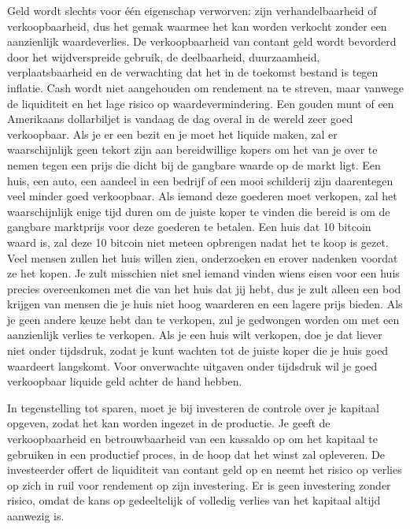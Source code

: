 Geld wordt slechts voor één eigenschap verworven: zijn verhandelbaarheid of verkoopbaarheid, dus het gemak waarmee het kan worden verkocht zonder een aanzienlijk waardeverlies. De verkoopbaarheid van contant geld wordt bevorderd door het wijdverspreide gebruik, de deelbaarheid, duurzaamheid, verplaatsbaarheid en de verwachting dat het in de toekomst bestand is tegen inflatie. Cash wordt niet aangehouden om rendement na te streven, maar vanwege de liquiditeit en het lage risico op waardevermindering. Een gouden munt of een Amerikaans dollarbiljet is vandaag de dag overal in de wereld zeer goed verkoopbaar. Als je er een bezit en je moet het liquide maken, zal er waarschijnlijk geen tekort zijn aan bereidwillige kopers om het van je over te nemen tegen een prijs die dicht bij de gangbare waarde op de markt ligt. Een huis, een auto, een aandeel in een bedrijf of een mooi schilderij zijn daarentegen veel minder goed verkoopbaar. Als iemand deze goederen moet verkopen, zal het waarschijnlijk enige tijd duren om de juiste koper te vinden die bereid is om de gangbare marktprijs voor deze goederen te betalen. Een huis dat 10 bitcoin waard is, zal deze 10 bitcoin niet meteen opbrengen nadat het te koop is gezet. Veel mensen zullen het huis willen zien, onderzoeken en erover nadenken voordat ze het kopen. Je zult misschien niet snel iemand vinden wiens eisen voor een huis precies overeenkomen met die van het huis dat jij hebt, dus je zult alleen een bod krijgen van mensen die je huis niet hoog waarderen en een lagere prijs bieden. Als je geen andere keuze hebt dan te verkopen, zul je gedwongen worden om met een aanzienlijk verlies te verkopen. Als je een huis wilt verkopen, doe je dat liever niet onder tijdsdruk, zodat je kunt wachten tot de juiste koper die je huis goed waardeert langskomt. Voor onverwachte uitgaven onder tijdsdruk wil je goed verkoopbaar liquide geld achter de hand hebben.

In tegenstelling tot sparen, moet je bij investeren de controle over je kapitaal opgeven, zodat het kan worden ingezet in de productie. Je geeft de verkoopbaarheid en betrouwbaarheid van een kassaldo op om het kapitaal te gebruiken in een productief proces, in de hoop dat het winst zal opleveren. De investeerder offert de liquiditeit van contant geld op en neemt het risico op verlies op zich in ruil voor rendement op zijn investering. Er is geen investering zonder risico, omdat de kans op gedeeltelijk of volledig verlies van het kapitaal altijd aanwezig is.

